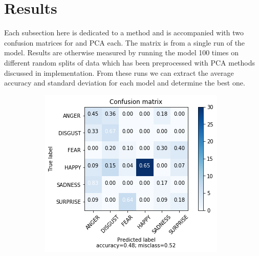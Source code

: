 \section{Results}

Each subsection here is dedicated to a method and is accompanied with two confusion matrices for \tsne and PCA each. The matrix is from a single run of the model. Results are otherwise measured by running the model 100 times on different random splits of data which has been preprocessed with PCA methods discussed in implementation. From these runs we can extract the average accuracy and standard deviation for each model and determine the best one.

\begin{figure}
    \centering
    \begin{subfigure}[b]{0.24\textwidth}
        \includegraphics[width=\textwidth]{figures/pca-knn.png}
        \caption{\knn}
        \label{fig:pca-knn}
    \end{subfigure}
    \begin{subfigure}[b]{0.24\textwidth}

\end{subfigure}
\end{figure}
